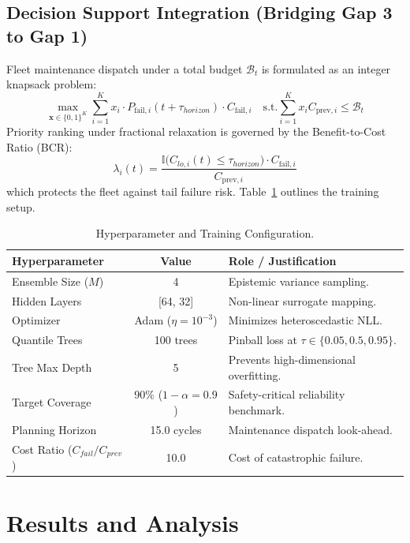 \documentclass[journal,10pt,twocolumn]{article}
\begin{document}
\subsection{Decision Support Integration (Bridging Gap 3 to Gap 1)}
Fleet maintenance dispatch under a total budget $\mathcal{B}_t$ is formulated as an integer knapsack problem:
\begin{equation}
\max_{\mathbf{x} \in \{0, 1\}^K} \sum_{i=1}^K x_i \cdot P_{\text{fail}, i}(t + \tau_{horizon}) \cdot C_{\text{fail}, i} \quad \text{s.t.} \sum_{i=1}^K x_i C_{\text{prev}, i} \le \mathcal{B}_t
\end{equation}
Priority ranking under fractional relaxation is governed by the Benefit-to-Cost Ratio (BCR):
\begin{equation}
\lambda_i(t) = \frac{\mathbb{I}\big( C_{lo, i}(t) \le \tau_{horizon} \big) \cdot C_{\text{fail}, i}}{C_{\text{prev}, i}}
\end{equation}
which protects the fleet against tail failure risk. Table~\ref{tab:hyperparameters} outlines the training setup.

\begin{table}[h]
\caption{Hyperparameter and Training Configuration.}
\label{tab:hyperparameters}
\centering
\small
\begin{tabular}{lcp{3.4cm}}
\toprule
\textbf{Hyperparameter} & \textbf{Value} & \textbf{Role / Justification} \\
\midrule
Ensemble Size ($M$) & 4 & Epistemic variance sampling. \\
Hidden Layers & [64, 32] & Non-linear surrogate mapping. \\
Optimizer & Adam ($\eta = 10^{-3}$) & Minimizes heteroscedastic NLL. \\
Quantile Trees & 100 trees & Pinball loss at $\tau \in \{0.05, 0.5, 0.95\}$. \\
Tree Max Depth & 5 & Prevents high-dimensional overfitting. \\
Target Coverage & 90\% ($1-\alpha=0.9$) & Safety-critical reliability benchmark. \\
Planning Horizon & 15.0 cycles & Maintenance dispatch look-ahead. \\
Cost Ratio ($C_{fail}/C_{prev}$) & 10.0 & Cost of catastrophic failure. \\
\bottomrule
\end{tabular}
\end{table}

\section{Results and Analysis}
\end{document}
